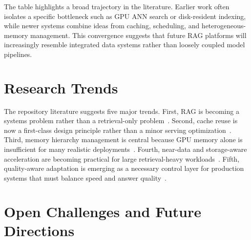 \documentclass[acmsmall,screen]{acmart}
\begin{document}
The table highlights a broad trajectory in the literature. Earlier work often isolates a specific bottleneck such as GPU ANN search or disk-resident indexing, while newer systems combine ideas from caching, scheduling, and heterogeneous-memory management. This convergence suggests that future RAG platforms will increasingly resemble integrated data systems rather than loosely coupled model pipelines.

\section{Research Trends}

The repository literature suggests five major trends. First, RAG is becoming a systems problem rather than a retrieval-only problem~\cite{rago2025,hermes2025,patchwork2025}. Second, cache reuse is now a first-class design principle rather than a minor serving optimization~\cite{cachecraft2025,cacheblend2025,memorag2025,hyperrag2025}. Third, memory hierarchy management is central because GPU memory alone is insufficient for many realistic deployments~\cite{smartssd2024,chameleon2025,diskann2019}. Fourth, near-data and storage-aware acceleration are becoming practical for large retrieval-heavy workloads~\cite{ndsearch2024,smartssd2024,lsmvec2025}. Fifth, quality-aware adaptation is emerging as a necessary control layer for production systems that must balance speed and answer quality~\cite{metis2025,aquapipe2025}.

\section{Open Challenges and Future Directions}
\end{document}
